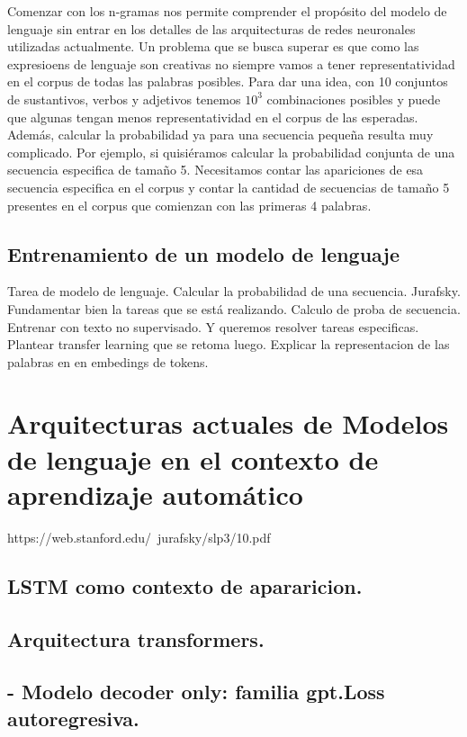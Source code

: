 \documentclass{book}
\begin{document}
Comenzar con los n-gramas nos permite comprender el propósito del modelo de lenguaje sin entrar en los detalles de las arquitecturas de redes neuronales utilizadas actualmente. Un problema que se busca superar es que como las expresioens de lenguaje son creativas no siempre vamos a tener representatividad en el corpus de todas las palabras posibles. Para dar una idea, con 10 conjuntos de sustantivos, verbos y adjetivos tenemos $10^3$ combinaciones posibles y puede que algunas tengan menos representatividad en el corpus de las esperadas. Además, calcular la probabilidad ya para una secuencia pequeña resulta muy complicado. Por ejemplo, si quisiéramos calcular la probabilidad conjunta de una secuencia especifica de tamaño 5. Necesitamos contar las apariciones de esa secuencia especifica en el corpus y contar la cantidad de secuencias de tamaño 5 presentes en el corpus que comienzan con las primeras 4 palabras. \cite{jurafsky2014speech} \\

\subsection{Entrenamiento de un modelo de lenguaje}

Tarea de modelo de lenguaje. Calcular la probabilidad de una secuencia. Jurafsky. Fundamentar bien la tareas que se está realizando. 
Calculo de proba de secuencia. Entrenar con texto no supervisado. Y queremos resolver tareas especificas. Plantear transfer learning que se retoma luego.
Explicar la representacion de las palabras en en embedings de tokens.



\section{Arquitecturas actuales de Modelos de lenguaje en el contexto de aprendizaje automático}

https://web.stanford.edu/~jurafsky/slp3/10.pdf

\subsection{LSTM como contexto de apararicion.}
\subsection{Arquitectura transformers.}
\subsection{- Modelo decoder only: familia gpt.Loss autoregresiva.}
\end{document}

